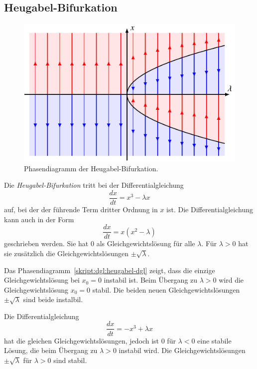 \subsection{Heugabel-Bifurkation}
%
\begin{figure}
\centering
\includegraphics{chapters/3/pitchfork.pdf}
\caption{Phasendiagramm der Heugabel-Bifurkation.
\label{skript:dgl:pitchfork}}
\end{figure}
Die {\em Heugabel-Bifurkation} tritt bei der Differentialgleichung
\begin{equation}
\frac{dx}{dt} = x^3 - \lambda x
\label{skript:dgl:heugabel-dgl}
\end{equation}
auf, bei der der führende Term
dritter Ordnung in $x$ ist.
Die Differentialgleichung
kann auch in der Form
\[
\frac{dx}{dt}
=
x(x^2-\lambda)
\]
geschrieben werden.
Sie hat $0$ als Gleichgewichtslösung für alle $\lambda$.
Für $\lambda>0$ hat sie zusätzlich die Gleichgewichtslösungen
$\pm\sqrt{\lambda}$.

Das Phasendiagramm~\ref{skript:dgl:heugabel-dgl} zeigt, dass
die einzige Gleichgewichtslösung bei $x_0=0$ instabil ist.
Beim Übergang zu $\lambda>0$ wird die Gleichgewichtslösung $x_0=0$
stabil.
Die beiden neuen Gleichgewichtslösungen $\pm\sqrt{\lambda}$ sind
beide instalbil.

Die Differentialgleichung
\[
\frac{dx}{dt} = -x^3+\lambda x
\]
hat die gleichen Gleichgewichtslösungen, jedoch ist $0$ für
$\lambda<0$ eine stabile Lösung, die beim Übergang zu $\lambda>0$
instabil wird.
Die Gleichgewichtslösungen $\pm\sqrt{\lambda}$ für $\lambda >0$
sind stabil.


